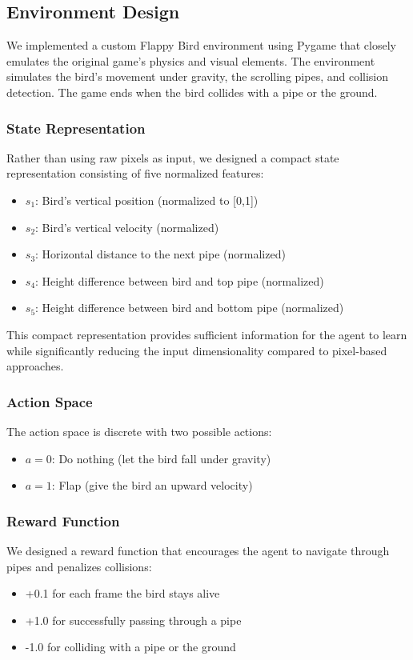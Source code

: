 \documentclass[conference]{IEEEtran}
\begin{document}
\subsection{Environment Design}
We implemented a custom Flappy Bird environment using Pygame that closely emulates the original game's physics and visual elements. The environment simulates the bird's movement under gravity, the scrolling pipes, and collision detection. The game ends when the bird collides with a pipe or the ground.

\subsubsection{State Representation}
Rather than using raw pixels as input, we designed a compact state representation consisting of five normalized features:
\begin{itemize}
    \item $s_1$: Bird's vertical position (normalized to [0,1])
    \item $s_2$: Bird's vertical velocity (normalized)
    \item $s_3$: Horizontal distance to the next pipe (normalized)
    \item $s_4$: Height difference between bird and top pipe (normalized)
    \item $s_5$: Height difference between bird and bottom pipe (normalized)
\end{itemize}

This compact representation provides sufficient information for the agent to learn while significantly reducing the input dimensionality compared to pixel-based approaches.

\subsubsection{Action Space}
The action space is discrete with two possible actions:
\begin{itemize}
    \item $a=0$: Do nothing (let the bird fall under gravity)
    \item $a=1$: Flap (give the bird an upward velocity)
\end{itemize}

\subsubsection{Reward Function}
We designed a reward function that encourages the agent to navigate through pipes and penalizes collisions:
\begin{itemize}
    \item +0.1 for each frame the bird stays alive
    \item +1.0 for successfully passing through a pipe
    \item -1.0 for colliding with a pipe or the ground
\end{itemize}
\end{document}
